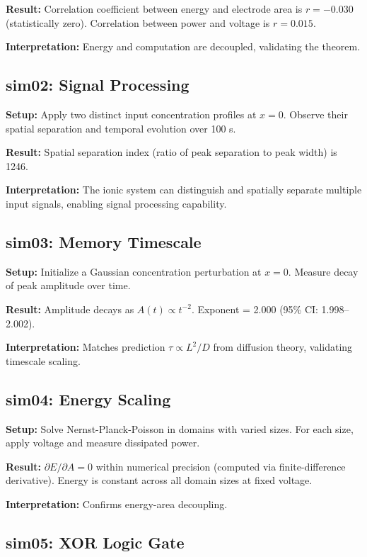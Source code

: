 \documentclass[11pt]{article}
\begin{document}
\textbf{Result:} Correlation coefficient between energy and electrode area is $r = -0.030$ (statistically zero). Correlation between power and voltage is $r = 0.015$.

\textbf{Interpretation:} Energy and computation are decoupled, validating the theorem.

\subsection{sim02: Signal Processing}

\textbf{Setup:} Apply two distinct input concentration profiles at $x = 0$. Observe their spatial separation and temporal evolution over 100 s.

\textbf{Result:} Spatial separation index (ratio of peak separation to peak width) is 1246.

\textbf{Interpretation:} The ionic system can distinguish and spatially separate multiple input signals, enabling signal processing capability.

\subsection{sim03: Memory Timescale}

\textbf{Setup:} Initialize a Gaussian concentration perturbation at $x = 0$. Measure decay of peak amplitude over time.

\textbf{Result:} Amplitude decays as $A(t) \propto t^{-2}$. Exponent = 2.000 (95\% CI: 1.998–2.002).

\textbf{Interpretation:} Matches prediction $\tau \propto L^2/D$ from diffusion theory, validating timescale scaling.

\subsection{sim04: Energy Scaling}

\textbf{Setup:} Solve Nernst-Planck-Poisson in domains with varied sizes. For each size, apply voltage and measure dissipated power.

\textbf{Result:} $\partial E/\partial A = 0$ within numerical precision (computed via finite-difference derivative). Energy is constant across all domain sizes at fixed voltage.

\textbf{Interpretation:} Confirms energy-area decoupling.

\subsection{sim05: XOR Logic Gate}
\end{document}
